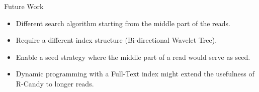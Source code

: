\documentclass{beamer}
\begin{document}

\begin{frame}{Future Work}
	\begin{itemize}
		\item Different search algorithm starting from the middle part of the reads.
		\item Require a different index structure (Bi-directional Wavelet Tree).

		\item Enable a seed strategy where the middle part of a read would serve 
			  as seed.
		
		\item Dynamic programming with a Full-Text index might 
			  extend the usefulness of R-Candy to longer reads.

\end{itemize}

\end{frame}

\end{document}
